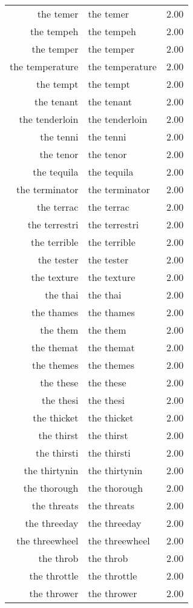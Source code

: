 \begin{table}[ht]
\begin{tabular}{rlr}
  the temer & the temer & 2.00 \\ 
  the tempeh & the tempeh & 2.00 \\ 
  the temper & the temper & 2.00 \\ 
  the temperature & the temperature & 2.00 \\ 
  the tempt & the tempt & 2.00 \\ 
  the tenant & the tenant & 2.00 \\ 
  the tenderloin & the tenderloin & 2.00 \\ 
  the tenni & the tenni & 2.00 \\ 
  the tenor & the tenor & 2.00 \\ 
  the tequila & the tequila & 2.00 \\ 
  the terminator & the terminator & 2.00 \\ 
  the terrac & the terrac & 2.00 \\ 
  the terrestri & the terrestri & 2.00 \\ 
  the terrible & the terrible & 2.00 \\ 
  the tester & the tester & 2.00 \\ 
  the texture & the texture & 2.00 \\ 
  the thai & the thai & 2.00 \\ 
  the thames & the thames & 2.00 \\ 
  the them & the them & 2.00 \\ 
  the themat & the themat & 2.00 \\ 
  the themes & the themes & 2.00 \\ 
  the these & the these & 2.00 \\ 
  the thesi & the thesi & 2.00 \\ 
  the thicket & the thicket & 2.00 \\ 
  the thirst & the thirst & 2.00 \\ 
  the thirsti & the thirsti & 2.00 \\ 
  the thirtynin & the thirtynin & 2.00 \\ 
  the thorough & the thorough & 2.00 \\ 
  the threats & the threats & 2.00 \\ 
  the threeday & the threeday & 2.00 \\ 
  the threewheel & the threewheel & 2.00 \\ 
  the throb & the throb & 2.00 \\ 
  the throttle & the throttle & 2.00 \\ 
  the thrower & the thrower & 2.00 \\ 

\end{tabular}
\end{table}
